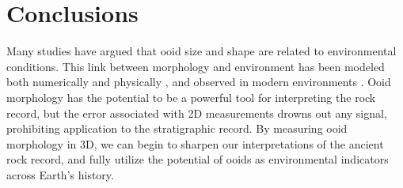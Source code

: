 \documentclass[draft]{agujournal2019}
\begin{document}
 
\section{Conclusions}

Many studies have argued that ooid size and shape are related to environmental conditions. This link between morphology and environment has been modeled both numerically and physically \cite{sumner1993numerical,sipos2018shape, trower2017experimental}, and observed in modern environments \cite{trower2018active}. Ooid morphology has the potential to be a powerful tool for interpreting the rock record, but the error associated with 2D measurements drowns out any signal, prohibiting application to the stratigraphic record. By measuring ooid morphology in 3D, we can begin to sharpen our interpretations of the ancient rock record, and fully utilize the potential of ooids as environmental indicators across Earth's history. 









%
%
%
%
%
%
%
%
%
%
\end{document}
